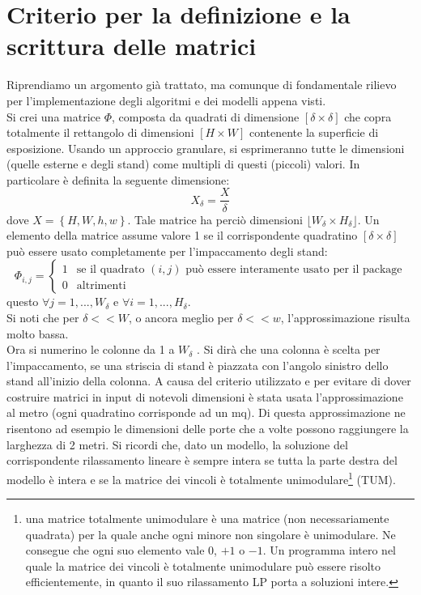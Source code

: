 \documentclass[12pt,a4paper,openright,twoside]{report}
\begin{document}
\section{Criterio per la definizione e la scrittura delle matrici}
Riprendiamo un argomento gi\`{a} trattato, ma comunque di fondamentale rilievo per l'implementazione degli algoritmi e dei modelli appena visti.\\
Si crei una matrice $\Phi$, composta da quadrati di dimensione $[\delta \times \delta]$ che copra totalmente il rettangolo di dimensioni $[H \times W]$ contenente la superficie di esposizione. Usando un approccio granulare, si esprimeranno tutte le dimensioni (quelle esterne e degli stand) come multipli di questi (piccoli) valori. In particolare \`{e} definita la seguente dimensione:
$$X_{\delta} = \dfrac{X}{\delta}$$
dove $X =\left\lbrace H, W, h, w\right\rbrace $. Tale matrice ha perci\`{o} dimensioni $\lfloor W_{\delta} \times H_{\delta}\rfloor$. Un elemento della matrice assume valore 1 se il corrispondente quadratino $[\delta \times \delta]$ pu\`{o} essere usato completamente per l'impaccamento degli stand:
$$ 
\Phi_{i,j} =  
\left\{
\begin{array}{rl}
1 & \mbox{se il quadrato } (i, j) \mbox{ pu\`{o} essere interamente usato per il package}\\
0 & \mbox{altrimenti}
\end{array}
\right.
$$
questo $\forall j = 1,...,W_{\delta}$ e $\forall i = 1,...,H_{\delta}$. 
\\Si noti che per $\delta << W$, o ancora meglio per $\delta << w$, l'approssimazione risulta molto bassa. \\
Ora si numerino le colonne da 1 a $W_{\delta}$ . Si dir\`{a} che una colonna \`{e} scelta per l'impaccamento, se una striscia di stand \`{e} piazzata con l'angolo sinistro dello stand all'inizio della colonna. A causa del criterio utilizzato e per evitare di dover costruire matrici in input di notevoli dimensioni \`{e} stata usata l'approssimazione al metro (ogni quadratino corrisponde ad un mq). Di questa approssimazione ne risentono ad esempio le dimensioni delle porte che a volte possono raggiungere la larghezza di 2 metri. 
Si ricordi che, dato un modello, la soluzione del corrispondente rilassamento lineare \`{e} sempre intera se tutta la parte destra del modello \`{e} intera e se la matrice dei vincoli \`{e} totalmente unimodulare\footnote{una matrice totalmente unimodulare \`{e} una matrice (non necessariamente quadrata) per la quale anche ogni minore non singolare \`{e} unimodulare. Ne consegue che ogni suo elemento vale $0$, $+1$ o $-1$. Un programma intero nel quale la matrice dei vincoli \`{e} totalmente unimodulare pu\`{o} essere risolto efficientemente, in quanto il suo rilassamento LP porta a soluzioni intere.} (TUM).
\end{document}
